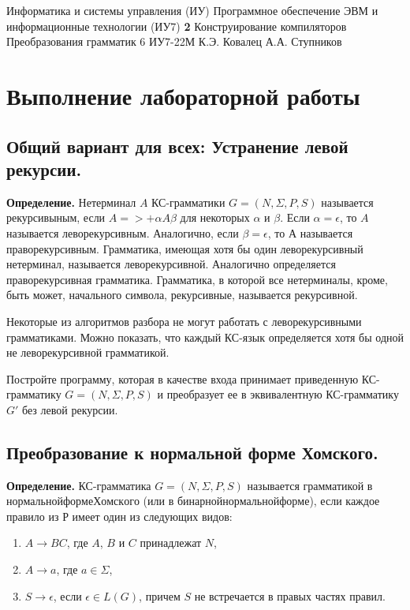 \documentclass{bmstu}
\begin{document}
\makereporttitle
{Информатика и системы управления (ИУ)}
{Программное обеспечение ЭВМ и информационные технологии (ИУ7)}
{\textbf{2}}
{Конструирование компиляторов}
{Преобразования грамматик}
{6}
{ИУ7-22М}
{К.Э. Ковалец}
{А.А. Ступников}


\setcounter{page}{2}


\chapter{Выполнение лабораторной работы}

\section{Общий вариант для всех: Устранение левой рекурсии.}

\textbf{Определение.} Нетерминал $A$ КС-грамматики $G = (N, \Sigma, P, S)$ называется рекурсивыным, если $A =>+ \alpha A \beta$ для некоторых $\alpha$ и $\beta$. Если $\alpha = \epsilon$, то $A$ называется леворекурсивным. Аналогично, если $\beta = \epsilon$, то $А$ называется праворекурсивным. Грамматика, имеющая хотя бы один леворекурсивный нетерминал, называется леворекурсивной. Аналогично определяется праворекурсивная грамматика. Грамматика, в которой все нетерминалы, кроме, быть может, начального символа, рекурсивные, называется рекурсивной.

Некоторые из алгоритмов разбора не могут работать с леворекурсивными грамматиками. Можно показать, что каждый КС-язык определяется хотя бы одной не леворекурсивной грамматикой.

Постройте программу, которая в качестве входа принимает приведенную КС-грамматику $G = (N, \Sigma, P, S)$ и преобразует ее в эквивалентную КС-грамматику $G'$ без левой рекурсии.

\section{Преобразование к нормальной форме Хомского.}

\textbf{Определение.} КС-грамматика $G = (N, \Sigma, P, S)$ называется грамматикой в $нормальной форме Хомского$ (или в $бинарной нормальной форме$), если каждое правило из $Р$ имеет один из следующих видов:
\begin{enumerate}
    \item $A \rightarrow BC$, где $A$, $B$ и $C$ принадлежат $N$,
    \item $A \rightarrow a$, где $a \in \Sigma$,
    \item $S \rightarrow \epsilon$, если $\epsilon \in L(G)$, причем $S$ не встречается в правых частях правил.
\end{enumerate}
\end{document}

